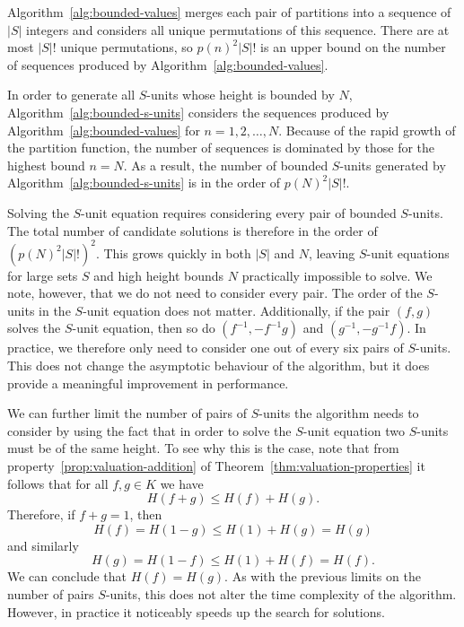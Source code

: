 Algorithm~\ref{alg:bounded-values} merges each pair of partitions into a sequence of \(|S|\) integers and considers all unique permutations of this sequence. There are at most \(|S|!{}\) unique permutations, so \({p(n)}^{2}|S|!{}\) is an upper bound on the number of sequences produced by Algorithm~\ref{alg:bounded-values}.

In order to generate all \(S\)-units whose height is bounded by \(N\), Algorithm~\ref{alg:bounded-s-units} considers the sequences produced by Algorithm~\ref{alg:bounded-values} for \(n = 1, 2, \dots, N\). Because of the rapid growth of the partition function, the number of sequences is dominated by those for the highest bound \(n = N\). As a result, the number of bounded \(S\)-units generated by Algorithm~\ref{alg:bounded-s-units} is in the order of \({p(N)}^{2}|S|!{}\).

Solving the \(S\)-unit equation requires considering every pair of bounded \(S\)-units. The total number of candidate solutions is therefore in the order of \({({p(N)}^{2}|S|!{})}^{2}\). This grows quickly in both \(|S|\) and \(N\), leaving \(S\)-unit equations for large sets \(S\) and high height bounds \(N\) practically impossible to solve. We note, however, that we do not need to consider every pair. The order of the \(S\)-units in the \(S\)-unit equation does not matter. Additionally, if the pair \((f, g)\) solves the \(S\)-unit equation, then so do \((f^{-1}, - f^{-1}g)\) and \((g^{-1}, - g^{-1}f)\). In practice, we therefore only need to consider one out of every six pairs of \(S\)-units. This does not change the asymptotic behaviour of the algorithm, but it does provide a meaningful improvement in performance.

We can further limit the number of pairs of \(S\)-units the algorithm needs to consider by using the fact that in order to solve the \(S\)-unit equation two \(S\)-units must be of the same height. To see why this is the case, note that from property~\ref{prop:valuation-addition} of Theorem~\ref{thm:valuation-properties} it follows that for all \(f, g \in K\) we have
\[H(f + g) \leq H(f) + H(g).\]
Therefore, if \(f + g = 1\), then
\[H(f) = H(1 - g) \leq H(1) + H(g) = H(g)\]
and similarly
\[H(g) = H(1 - f) \leq H(1) + H(f) = H(f).\]
We can conclude that \(H(f) = H(g)\). As with the previous limits on the number of pairs \(S\)-units, this does not alter the time complexity of the algorithm. However, in practice it noticeably speeds up the search for solutions.
